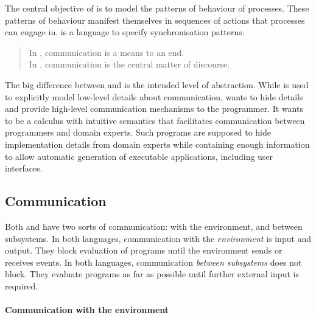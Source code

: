 The central objective of \CSP is to model the patterns of behaviour of processes.
These patterns of behaviour manifest themselves in sequences of actions that processes can engage in.
\CSP is a language to specify synchronisation patterns.

\begin{quote}
\noindent In \TOP, communication is a means to an end. \\
In \CSP, communication is the central matter of discourse.
\end{quote}

%
The big difference between \CSP and \TOP is the intended level of abstraction.
While \CSP is used to explicitly model low-level details about communication, \TOPHAT wants to hide details and provide high-level communication mechanisms to the programmer.
It wants to be a calculus with intuitive semantics that facilitates communication between programmers and domain experts.
Such programs are supposed to hide implementation details from domain experts while containing enough information to allow automatic generation of executable applications, including user interfaces.




\subsection{Communication}

Both \TOP and \CSP have two sorts of communication: with the environment, and between subsystems.
In both languages, communication with the \emph{environment} is input and output.
They block evaluation of programs until the environment sends or receives events.
In both languages, communication \emph{between subsystems} does not block.
They evaluate programs as far as possible until further external input is required.



\paragraph{Communication with the environment}

